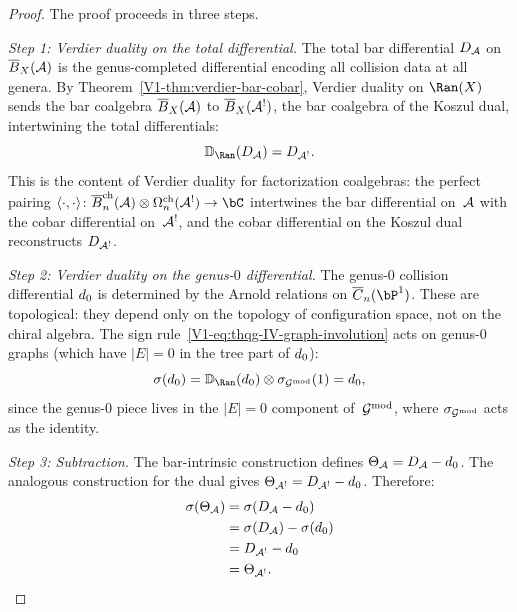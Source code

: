 \begin{proof}
The proof proceeds in three steps.

\emph{Step 1: Verdier duality on the total differential.}
The total bar differential $D_{\mathcal{A}}$ on $\overline{B}_X(\mathcal{A})$ is the
genus-completed differential encoding all collision data at all
genera. By Theorem~\ref*{V1-thm:verdier-bar-cobar}, Verdier duality on
$\Ran(X)$ sends the bar coalgebra $\overline{B}_X(\mathcal{A})$ to $\overline{B}_X(\mathcal{A}^!)$,
the bar coalgebra of the Koszul dual, intertwining the total
differentials:
\begin{equation}%
\VD_{\Ran}(D_\cA) = D_{\cA^!}.
\end{equation}
This is the content of Verdier duality for factorization coalgebras:
the perfect pairing
$\langle \cdot, \cdot \rangle\colon
\barB^{\mathrm{ch}}_n(\cA) \otimes \Omega^{\mathrm{ch}}_n(\cA^!)
\to \bC$ intertwines the bar differential on~$\mathcal{A}$ with the cobar
differential on~$\mathcal{A}^!$, and the cobar differential on the Koszul
dual reconstructs $D_{\mathcal{A}^!}$.

\emph{Step 2: Verdier duality on the genus-$0$ differential.}
The genus-$0$ collision differential $d_0$ is determined by the
Arnold relations on $\overline{C}_n(\bP^1)$. These are topological:
they depend only on the topology of configuration space, not on the
chiral algebra. The sign rule~\eqref{V1-eq:thqg-IV-graph-involution}
acts on genus-$0$ graphs (which have $|E| = 0$ in the tree part of
$d_0$):
\begin{equation}%
\sigma(\dzero) = \VD_{\Ran}(\dzero) \otimes \sigma_{\Gmod}(1) = \dzero,
\end{equation}
since the genus-$0$ piece lives in the $|E| = 0$ component of~$\mathcal{G}^{\mathrm{mod}}$,
where $\sigma_{\mathcal{G}^{\mathrm{mod}}}$ acts as the identity.

\emph{Step 3: Subtraction.}
The bar-intrinsic construction defines $\Theta_{\mathcal{A}} = D_{\mathcal{A}} - d_0$.
The analogous construction for the dual gives
$\Theta_{\mathcal{A}^!} = D_{\mathcal{A}^!} - d_0$. Therefore:
\begin{align}
\sigma(\Theta_{\mathcal{A}})
&= \sigma(D_{\mathcal{A}} - d_0) \notag \\
&= \sigma(D_{\mathcal{A}}) - \sigma(d_0) \notag \\
&= D_{\mathcal{A}^!} - d_0 \notag \\
&= \Theta_{\mathcal{A}^!}.
\end{align}
\end{proof}

